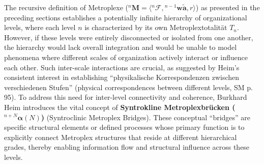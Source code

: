 \documentclass[12pt]{article}
\newcommand{\q}[1]{\enquote{#1}}
\newcommand{\metroplex}[1]{{}^{#1}\mathbf{M}}
\newcommand{\hypermetrophor}[1]{{}^{#1}\mathbf{w\widetilde{a}}}
\newcommand{\metroplexsynkolator}[1]{{}^{#1}\mathcal{F}}
\newcommand{\metroplextotalitaet}[1]{T_{#1}}
\newcommand{\syntroklinebruecke}[1]{{}^{#1}\bm{\alpha}}
\begin{document}
The recursive definition of Metroplexe (\( \metroplex{n} = \langle\metroplexsynkolator{n}, \hypermetrophor{n-1}, r\rangle \)) as presented in the preceding sections establishes a potentially infinite hierarchy of organizational levels, where each level \(n\) is characterized by its own Metroplextotalität \( \metroplextotalitaet{n} \). However, if these levels were entirely disconnected or isolated from one another, the hierarchy would lack overall integration and would be unable to model phenomena where different scales of organization actively interact or influence each other. Such inter-scale interactions are crucial, as suggested by Heim's consistent interest in establishing \q{physikalische Korrespondenzen zwischen verschiedenen Stufen} (physical correspondences between different levels, SM p. 95). To address this need for inter-level connectivity and coherence, Burkhard Heim introduces the vital concept of \textbf{Syntrokline Metroplexbrücken (\(\syntroklinebruecke{n+N}(N)\))} (Syntroclinic Metroplex Bridges). These conceptual \q{bridges} are specific structural elements or defined processes whose primary function is to explicitly connect Metroplex structures that reside at different hierarchical grades, thereby enabling information flow and structural influence across these levels.
\end{document}
